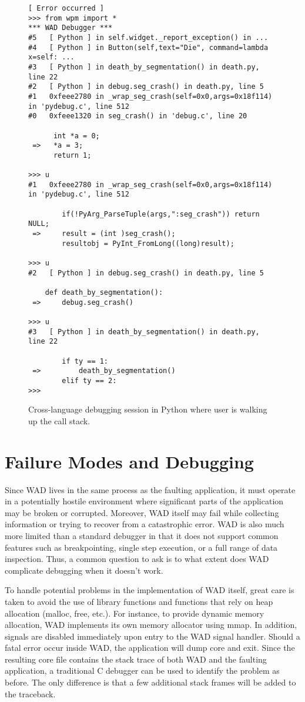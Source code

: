 \begin{figure*}[t]
{\small
\begin{verbatim}
[ Error occurred ]
>>> from wpm import *
*** WAD Debugger ***
#5   [ Python ] in self.widget._report_exception() in ...
#4   [ Python ] in Button(self,text="Die", command=lambda x=self: ...
#3   [ Python ] in death_by_segmentation() in death.py, line 22
#2   [ Python ] in debug.seg_crash() in death.py, line 5
#1   0xfeee2780 in _wrap_seg_crash(self=0x0,args=0x18f114) in 'pydebug.c', line 512
#0   0xfeee1320 in seg_crash() in 'debug.c', line 20

      int *a = 0;
 =>   *a = 3;
      return 1;

>>> u
#1   0xfeee2780 in _wrap_seg_crash(self=0x0,args=0x18f114) in 'pydebug.c', line 512
        
        if(!PyArg_ParseTuple(args,":seg_crash")) return NULL;
 =>     result = (int )seg_crash();
        resultobj = PyInt_FromLong((long)result);

>>> u
#2   [ Python ] in debug.seg_crash() in death.py, line 5
    
    def death_by_segmentation():
 =>     debug.seg_crash()
    
>>> u
#3   [ Python ] in death_by_segmentation() in death.py, line 22

        if ty == 1:
 =>         death_by_segmentation()
        elif ty == 2:
>>> \end{verbatim}
}
\caption{Cross-language debugging session in Python where user is walking up the call stack.}
\end{figure*}

\section{Failure Modes and Debugging}
\label{failure}

Since WAD lives in the same process as the faulting application, it
must operate in a potentially hostile environment where significant
parts of the application may be broken or corrupted.  Moreover, WAD
itself may fail while collecting information or trying to recover from
a catastrophic error.  WAD is also much more limited than a standard
debugger in that it does not support common features such as
breakpointing, single step execution, or a full range of data
inspection.  Thus, a common question to ask is to what extent does WAD
complicate debugging when it doesn't work.

To handle potential problems in the implementation of WAD itself,
great care is taken to avoid the use of library functions and
functions that rely on heap allocation (malloc, free, etc.).  For
instance, to provide dynamic memory allocation, WAD implements its own
memory allocator using mmap.  In addition, signals are disabled
immediately upon entry to the WAD signal handler.  Should a fatal
error occur inside WAD, the application will dump core and exit.  Since
the resulting core file contains the stack trace of both WAD and the
faulting application, a traditional C debugger can be used to identify
the problem as before.  The only difference is that a few additional
stack frames will be added to the traceback.

